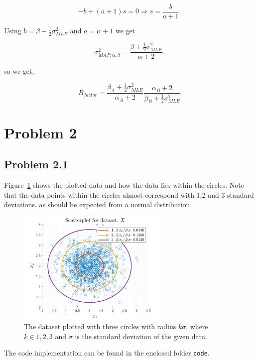 \documentclass{article}
\begin{document}
\begin{equation}
-b+(a+1)s=0 \Rightarrow s = \frac{b}{a+1}.
\end{equation}

Using $b=\beta+\frac{1}{2}\sigma^2_{MLE}$ and $a = \alpha +1$ we get

\begin{equation}
\sigma^2_{MAP;\alpha,\beta} = \frac{\beta + \frac{1}{2}\sigma^2_{MLE}}{\alpha+2}.
\end{equation}

so we get,

\begin{equation}
B_{factor} = \frac{\beta_A+\frac{1}{2}\sigma^2_{MLE}}{\alpha_A+2}\frac{\alpha_B+2}{\beta_B+\frac{1}{2}\sigma^2_{MLE}}
\label{eq:BF_MAP}
\end{equation}
\newpage 

\section*{Problem 2}
\subsection*{Problem 2.1}
Figure~\ref{fig:prob21} shows the plotted data and how the data lies within the circles. Note that the data points within the circles almost correspond with 1,2 and 3 standard deviations, as should be expected from a normal distribution. 
\begin{figure}[H]
	\centering
	\includegraphics[width=0.65\textwidth]{Figures/plot2_1_scatter.png}	\caption{\label{fig:prob21}The dataset plotted with three circles with radius $k\sigma$, where $k\in {1,2,3}$ and $\sigma$ is the standard deviation of the given data.}
\end{figure}
The code implementation can be found in the enclosed folder \verb|code|.
\end{document}
